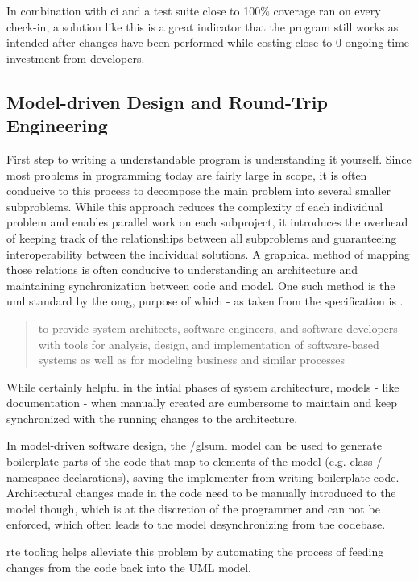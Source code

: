 In combination with \gls{ci} and a test suite close to 100\% \gls{coverage} ran on every check-in, a solution like this is a great indicator that the program still works as intended after changes have been performed while costing close-to-0 ongoing time investment from developers.

\subsection{Model-driven Design and Round-Trip Engineering}
First step to writing a understandable program is understanding it yourself. Since most problems in programming today are fairly large in scope, it is often conducive to this process to decompose the main problem into several smaller subproblems. While this approach reduces the complexity of each individual problem and enables parallel work on each subproject, it introduces the overhead of keeping track of the relationships between all subproblems and guaranteeing interoperability between the individual solutions. A graphical method of mapping those relations is often conducive to understanding an architecture and maintaining synchronization between code and model. One such method is the \gls{uml} standard by the \gls{omg}, purpose of which - as taken from the specification is .
\begin{quote}
to provide system architects, software engineers, and software developers with tools for analysis, design, and implementation of software-based systems as well as for modeling business and similar processes
\end{quote}

While certainly helpful in the intial phases of system architecture, models - like documentation - when manually created are cumbersome to maintain and keep synchronized with the running changes to the architecture.

In model-driven software design, the /gls{uml} model can be used to generate boilerplate parts of the code that map to elements of the model (e.g. class / namespace declarations), saving the implementer from writing boilerplate code. Architectural changes made in the code need to be manually introduced to the model though, which is at the discretion of the programmer and can not be enforced, which often leads to the model desynchronizing from the codebase. 

\gls{rte} tooling helps alleviate this problem by automating the process of feeding changes from the code back into the UML model.

